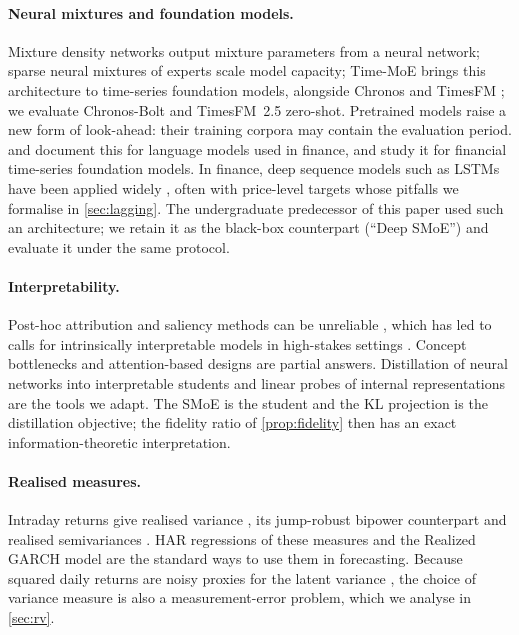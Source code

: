\paragraph{Neural mixtures and foundation models.}
Mixture density networks \citep{bishop1994mixture} output mixture parameters from a neural network;
sparse neural mixtures of experts \citep{shazeer2017outrageously,fedus2022switch} scale model
capacity; Time-MoE \citep{shi2025timemoe} brings this architecture to time-series foundation models,
alongside Chronos \citep{ansari2024chronos} and TimesFM \citep{das2024decoder}; we evaluate
Chronos-Bolt and TimesFM~2.5 zero-shot. Pretrained models raise a new form of look-ahead: their
training corpora may contain the evaluation period. \citet{glasserman2024assessing} and
\citet{sarkar2024lookahead} document this for language models used in finance, and
\citet{chen2026training} study it for financial time-series foundation models. In finance, deep
sequence models such as LSTMs have been applied widely \citep{fischer2018deep,sezer2020financial},
often with price-level targets whose pitfalls we formalise in \cref{sec:lagging}. The undergraduate
predecessor of this paper used such an architecture; we retain it as the black-box counterpart
(``Deep SMoE'') and evaluate it under the same protocol.

\paragraph{Interpretability.}
Post-hoc attribution \citep{lundberg2017unified} and saliency methods can be unreliable
\citep{adebayo2018sanity}, which has led to calls for intrinsically interpretable models in high-stakes
settings \citep{rudin2019stop}. Concept bottlenecks \citep{koh2020concept} and attention-based designs
\citep{lim2021temporal} are partial answers. Distillation of neural networks into interpretable
students \citep{hinton2015distilling,frosst2017distilling} and linear probes of internal representations
\citep{alain2016understanding} are the tools we adapt. The SMoE is the student and the KL projection
is the distillation objective; the fidelity ratio of \cref{prop:fidelity} then has an exact
information-theoretic interpretation.

\paragraph{Realised measures.}
Intraday returns give realised variance \citep{andersen2003modeling}, its jump-robust bipower
counterpart \citep{barndorff2004power} and realised semivariances \citep{patton2015good}. HAR
regressions of these measures \citep{corsi2009simple,andersen2007roughing,corsi2010threshold} and the
Realized GARCH model \citep{hansen2012realized} are the standard ways to use them in forecasting.
Because squared daily returns are noisy proxies for the latent variance
\citep{andersen1998answering}, the choice of variance measure is also a measurement-error problem,
which we analyse in \cref{sec:rv}.

